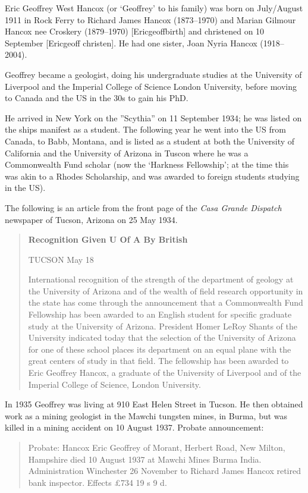 
Eric Geoffrey West Hancox (or `Geoffrey' to his family) was  born on July/August 1911 in Rock Ferry to Richard James Hancox (1873--1970) and Marian Gilmour Hancox nee Croskery (1879--1970) [Ericgeoffbirth] and christened on 10 September [Ericgeoff christen].  He had one sister, Joan Nyria Hancox (1918--2004).  

Geoffrey became a geologist, doing his undergraduate studies at the University of Liverpool and the Imperial College of Science London University, before moving to Canada and the US in the 30s to gain his PhD.

He arrived in New York on the ''Scythia'' on 11 September 1934; he was listed on the ships manifest as a student.\cite{NYpassengers}
The following year he went into the US from Canada, to Babb, Montana, and is listed as a student at both the University of California
and the University of Arizona in Tuscon\cite{USCanadaBorderCrossings} where he was a Commonwealth Fund scholar
(now the `Harkness Fellowship'; at the time this was akin to a Rhodes Scholarship, and was awarded to foreign students studying in the US).

The following is an article from the front page of the \emph{Casa Grande Dispatch} newspaper of Tucson, Arizona on 25 May 1934.\cite{CasaP1}

\begin{quotation}
\textbf{Recognition Given U Of A By British}

TUCSON May 18

International recognition of the strength of the department of geology at the University of Arizona and of the wealth of field research opportunity in the state has come through the announcement that a Commonwealth Fund Fellowship has been awarded to an English student for specific graduate study at the University of Arizona. President Homer LeRoy Shants of the University indicated today that the selection of the University of Arizona for one of these school places its department on an equal plane with the great centers of study in that field. The fellowship has been awarded to Eric Geoffrey Hancox, a graduate of the University of Liverpool and of the Imperial College of Science, London University.
\end{quotation}

In 1935 Geoffrey was living at 910 East Helen Street in Tucson.\cite{USCities}
He then obtained work as a mining geologist in  the Mawchi tungsten mines, in Burma, but was killed in a mining accident on 10 August 1937.
Probate announcement:\cite{EGWHprobate}
\begin{quotation}
Probate: Hancox Eric Geoffrey of Morant, Herbert Road, New Milton, Hampshire died 10 August 1937 at Mawchi Mines Burma India. Administration Winchester 26 November to Richard James Hancox retired bank inspector. Effects \pounds734 19 s 9 d.
\end{quotation}
